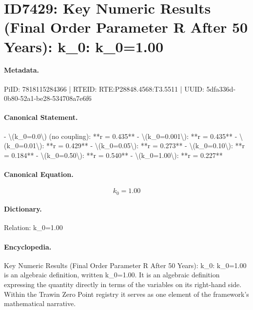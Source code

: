 \section*{ID7429: Key Numeric Results (Final Order Parameter R After 50 Years): k\_0: k\_0=1.00}
\paragraph{Metadata.}
PiID: 7818115284366 | RTEID: RTE:P28848.4568:T3.5511 | UUID: 5dfa336d-0b80-52a1-be28-534708a7e6f6

\paragraph{Canonical Statement.}
- \textbackslash{}(k\_0=0.0\textbackslash{}) (no coupling): **r = 0.435** - \textbackslash{}(k\_0=0.001\textbackslash{}): **r = 0.435** - \textbackslash{}(k\_0=0.01\textbackslash{}): **r = 0.429** - \textbackslash{}(k\_0=0.05\textbackslash{}): **r = 0.273** - \textbackslash{}(k\_0=0.10\textbackslash{}): **r = 0.184** - \textbackslash{}(k\_0=0.50\textbackslash{}): **r = 0.540** - \textbackslash{}(k\_0=1.00\textbackslash{}): **r = 0.227**

\paragraph{Canonical Equation.}
\[
k_0=1.00
\]

\paragraph{Dictionary.}
Relation: k\_0=1.00

\paragraph{Encyclopedia.}
Key Numeric Results (Final Order Parameter R After 50 Years): k\_0: k\_0=1.00 is an algebraic definition, written k\_0=1.00. It is an algebraic definition expressing the quantity directly in terms of the variables on its right-hand side. Within the Trawin Zero Point registry it serves as one element of the framework's mathematical narrative.
